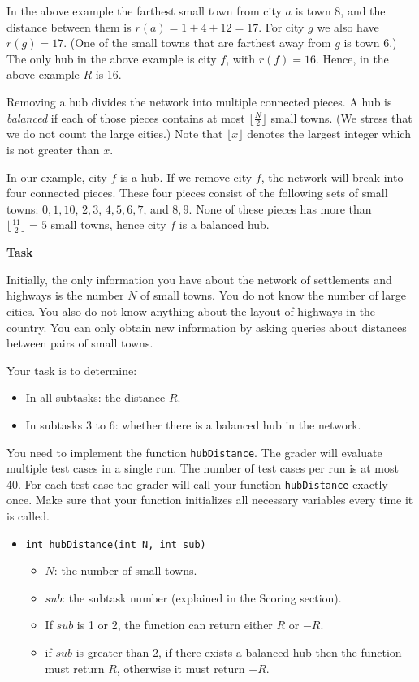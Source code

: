 In the above example the farthest small town from city $a$ is town 8, and the distance between them is $r(a) = 1 + 4 + 12 = 17$. For city $g$ we also have $r(g) = 17$. (One of the small towns that are farthest away from $g$ is town 6.) The only hub in the above example is city $f$, with $r(f) = 16$. Hence, in the above example $R$ is 16.

Removing a hub divides the network into multiple connected pieces. A hub is \textit{balanced} if each of those pieces contains at most $\lfloor \frac{N}{2} \rfloor$ small towns. (We stress that we do not count the large cities.) Note that $\lfloor x \rfloor$ denotes the largest integer which is not greater than $x$.

In our example, city $f$ is a hub. If we remove city $f$, the network will break into four connected pieces. These four pieces consist of the following sets of small towns: {$0, 1, 10$}, {$2, 3$}, {$4,5,6,7$}, and {$8, 9$}. None of these pieces has more than  $\lfloor \frac{11}{2} \rfloor = 5$ small towns, hence city $f$ is a balanced hub.

\textbf{Task}

Initially, the only information you have about the network of settlements and highways is the number $N$ of small towns. You do not know the number of large cities. You also do not know anything about
the layout of highways in the country. You can only obtain new information by asking queries about distances between pairs of small towns.

Your task is to determine:
\begin{itemize}
\item In all subtasks: the distance $R$.
\item In subtasks $3$ to $6$: whether there is a balanced hub in the network.
\end{itemize}

You need to implement the function \texttt{hubDistance}. The grader will evaluate multiple test cases in a single run. The number of test cases per run is at most 40. For each test case the grader will call your
function \texttt{hubDistance} exactly once. Make sure that your function initializes all necessary variables every time it is called.

\begin{itemize}
\item \texttt{int hubDistance(int N, int sub)}
\begin{itemize}
\item $N$: the number of small towns.
\item $sub$: the subtask number (explained in the Scoring section).
\item If $sub$ is 1 or 2, the function can return either $R$ or $-R$.
\item if $sub$ is greater than 2, if there exists a balanced hub then the function must return $R$, otherwise it must return $-R$.
\end{itemize}
\end{itemize}

